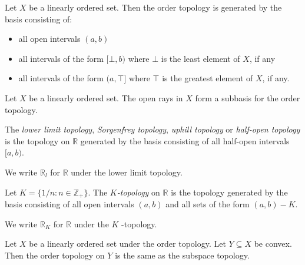 \begin{prop}
Let $X$ be a linearly ordered set. Then the order topology is generated by the basis consisting of:
\begin{itemize}
\item all open intervals $(a,b)$
\item all intervals of the form $[\bot, b)$ where $\bot$ is the least element of $X$, if any
\item all intervals of the form $(a, \top]$ where $\top$ is the greatest element of $X$, if any.
\end{itemize}
\end{prop}

\begin{prop}
Let $X$ be a linearly ordered set. The open rays in $X$ form a subbasis for the order topology.
\end{prop}

\begin{df}
The \emph{lower limit topology}, \emph{Sorgenfrey topology}, \emph{uphill topology} or \emph{half-open topology} is the topology on $\mathbb{R}$ generated by the basis consisting of all half-open intervals $[a,b)$.

We write $\mathbb{R}_l$ for $\mathbb{R}$ under the lower limit topology.
\end{df}

\begin{df}[$K$-topology]
Let $K = \{ 1/n : n \in \mathbb{Z}_+ \}$. The \emph{$K$-topology} on $\mathbb{R}$ is the topology generated by the basis consisting of all open intervals $(a,b)$ and all sets of the form $(a,b) - K$.

We write $\mathbb{R}_K$ for $\mathbb{R}$ under the $K$ -topology.
\end{df}

\begin{prop}
Let $X$ be a linearly ordered set under the order topology. Let $Y \subseteq X$ be convex. Then the order topology on $Y$ is the same as the subspace topology.
\end{prop}

